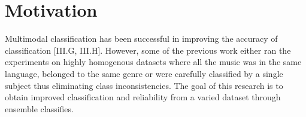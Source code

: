 \chapter{Motivation}

Multimodal classification has been successful in improving the accuracy of classification 
[III.G, III.H].  However, some of the previous work either ran the experiments on highly homogenous 
datasets where all the music was in the same language, belonged to the same genre or 
were carefully classified by a single subject thus eliminating class inconsistencies.  The goal of 
this research is to obtain improved classification and reliability from a varied dataset 
through ensemble classifies. 


